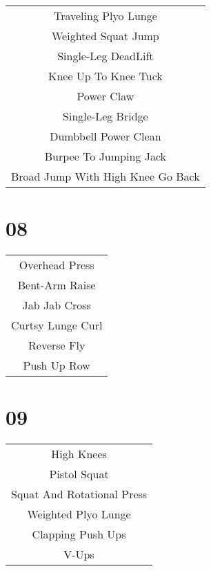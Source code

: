 \documentclass[12pt]{article}
\newcommand\myPadding{1.5}
\begin{document}
\begin{center}
  \bgroup
  \def\arraystretch{\myPadding}%
  \begin{tabular}{ c  }
  Traveling Plyo Lunge
  \\
  Weighted Squat Jump
  \\
  Single-Leg DeadLift
  \\
  Knee Up To Knee Tuck
  \\
  Power Claw
  \\
  Single-Leg Bridge
  \\
  Dumbbell Power Clean
  \\
  Burpee To Jumping Jack
  \\
  Broad Jump With High Knee Go Back
  \end{tabular}
  \egroup
\end{center}







\section{08}




\begin{center}
  \bgroup
  \def\arraystretch{\myPadding}%
  \begin{tabular}{ c  }
  Overhead Press
  \\
  Bent-Arm Raise
  \\
  Jab Jab Cross
  \\
  Curtsy Lunge Curl
  \\
  Reverse Fly
  \\
  Push Up Row
  \end{tabular}
  \egroup
\end{center}




\section{09}



\begin{center}
  \bgroup
  \def\arraystretch{\myPadding}%
  \begin{tabular}{ c  }
  High Knees
  \\
  Pistol Squat
  \\
  Squat And Rotational Press
  \\
  Weighted Plyo Lunge
  \\
  Clapping Push Ups
  \\
  V-Ups
  \end{tabular}
  \egroup
\end{center}
\end{document}
